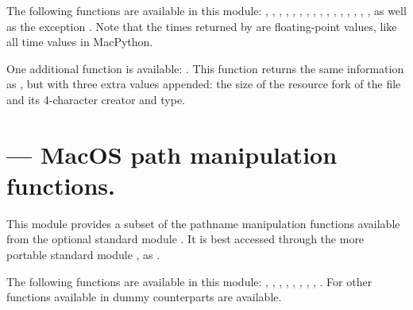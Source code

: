 The following functions are available in this module:
,
,
,
,
,
,
,
,
,
,
,
,
,
,
,
,
as well as the exception . Note that the times
returned by  are floating-point values, like all time
values in MacPython.

One additional function is available: . This function
returns the same information as , but with three extra
values appended: the size of the resource fork of the file and its
4-character creator and type.


\section{ ---
         MacOS path manipulation functions.}



This module provides a subset of the pathname manipulation functions
available from the optional standard module .  It is
best accessed through the more portable standard module , as
.

The following functions are available in this module:
,
,
,
,
,
,
,
,
.
For other functions available in  dummy counterparts
are available.
